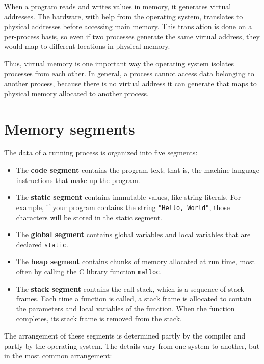 \documentclass[12pt]{book}
\begin{document}
{When a program reads and writes values in memory, it generates virtual
addresses.  The hardware, with help from the operating system,
translates to physical addresses before accessing main memory.  This
translation is done on a per-process basis, so even if two processes
generate the same virtual address, they would map to different
locations in physical memory.

Thus, virtual memory is one important way the operating system
isolates processes from each other.  In general, a process cannot
access data belonging to another process, because there is no
virtual address it can generate that maps to physical memory
allocated to another process.



\section{Memory segments}

The data of a running process is organized into five segments:

\begin{itemize}

\item The {\bf code segment} contains the program text; that is, the
  machine language instructions that make up the program.

\item The {\bf static segment} contains immutable values, like string
literals.  For example, if your program contains the string
{\tt "Hello, World"}, those characters will be stored in the
static segment.

\item The {\bf global segment} contains global variables and local variables that are declared {\tt static}.

\item The {\bf heap segment} contains chunks of memory allocated
  at run time, most often by calling the C library function
  {\tt malloc}.

\item The {\bf stack segment} contains the call stack, which is a
  sequence of stack frames.  Each time a function is called, a stack
  frame is allocated to contain the 
  parameters and local variables of the function.  When the function
  completes, its stack frame is removed from the stack.

\end{itemize}

The arrangement of these segments is determined partly by the 
compiler and partly by the operating system.  The details vary
from one system to another, but in the most common arrangement:

}
\end{document}
